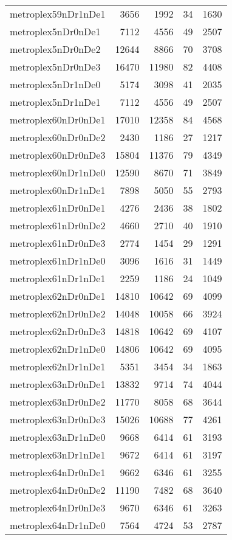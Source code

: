 \begin{tabular}{lrrrr}
metroplex59nDr1nDe1 & 3656 & 1992 & 34 & 1630 \\
metroplex5nDr0nDe1 & 7112 & 4556 & 49 & 2507 \\
metroplex5nDr0nDe2 & 12644 & 8866 & 70 & 3708 \\
metroplex5nDr0nDe3 & 16470 & 11980 & 82 & 4408 \\
metroplex5nDr1nDe0 & 5174 & 3098 & 41 & 2035 \\
metroplex5nDr1nDe1 & 7112 & 4556 & 49 & 2507 \\
metroplex60nDr0nDe1 & 17010 & 12358 & 84 & 4568 \\
metroplex60nDr0nDe2 & 2430 & 1186 & 27 & 1217 \\
metroplex60nDr0nDe3 & 15804 & 11376 & 79 & 4349 \\
metroplex60nDr1nDe0 & 12590 & 8670 & 71 & 3849 \\
metroplex60nDr1nDe1 & 7898 & 5050 & 55 & 2793 \\
metroplex61nDr0nDe1 & 4276 & 2436 & 38 & 1802 \\
metroplex61nDr0nDe2 & 4660 & 2710 & 40 & 1910 \\
metroplex61nDr0nDe3 & 2774 & 1454 & 29 & 1291 \\
metroplex61nDr1nDe0 & 3096 & 1616 & 31 & 1449 \\
metroplex61nDr1nDe1 & 2259 & 1186 & 24 & 1049 \\
metroplex62nDr0nDe1 & 14810 & 10642 & 69 & 4099 \\
metroplex62nDr0nDe2 & 14048 & 10058 & 66 & 3924 \\
metroplex62nDr0nDe3 & 14818 & 10642 & 69 & 4107 \\
metroplex62nDr1nDe0 & 14806 & 10642 & 69 & 4095 \\
metroplex62nDr1nDe1 & 5351 & 3454 & 34 & 1863 \\
metroplex63nDr0nDe1 & 13832 & 9714 & 74 & 4044 \\
metroplex63nDr0nDe2 & 11770 & 8058 & 68 & 3644 \\
metroplex63nDr0nDe3 & 15026 & 10688 & 77 & 4261 \\
metroplex63nDr1nDe0 & 9668 & 6414 & 61 & 3193 \\
metroplex63nDr1nDe1 & 9672 & 6414 & 61 & 3197 \\
metroplex64nDr0nDe1 & 9662 & 6346 & 61 & 3255 \\
metroplex64nDr0nDe2 & 11190 & 7482 & 68 & 3640 \\
metroplex64nDr0nDe3 & 9670 & 6346 & 61 & 3263 \\
metroplex64nDr1nDe0 & 7564 & 4724 & 53 & 2787 \\

\end{tabular}
